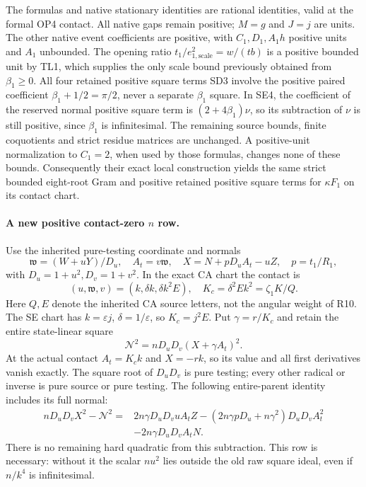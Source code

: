 The formulas and native stationary identities are rational identities,
valid at the formal OP4 contact. All native gaps remain positive; $M=g$
and $J=j$ are units. The other native event coefficients are positive,
with $C_1,D_1,A_1h$ positive units and $A_1$ unbounded. The opening
ratio $t_1/e_{1,\mathrm{scale}}^2=w/(tb)$ is a positive bounded unit
by TL1, which supplies the only scale bound previously obtained from
$\beta_1\ge0$. All four retained positive square terms SD3 involve the positive
paired coefficient $\beta_1+1/2=\pi/2$, never a separate
$\beta_1$ square. In SE4, the coefficient of the reserved normal positive square term
is $(2+4\beta_1)\nu$, so its subtraction of $\nu$ is still positive,
since $\beta_1$ is infinitesimal. The remaining source bounds, finite
coquotients and strict residue matrices are unchanged. A positive-unit
normalization to $C_1=2$, when used by those formulas, changes none of
these bounds. Consequently their exact local construction yields the
same strict bounded eight-root Gram and positive retained positive square terms for
$\kappa F_1$ on its contact chart.

\paragraph{A new positive contact-zero $n$ row.}
Use the inherited pure-testing coordinate and normals
\[
 \mathfrak w=(W+uY)/D_u,\quad A_t=v\mathfrak w,\quad
 X=N+pD_uA_t-uZ,\quad p=t_1/R_1,
\]
with $D_u=1+u^2,D_v=1+v^2$. In the exact CA chart the contact is
\[
 (u,\mathfrak w,v)=(k,\delta k,\delta k^2E),\quad
 K_c=\delta^2Ek^2=\zeta_1K/Q.
\]
Here $Q,E$ denote the inherited CA source letters, not the angular
weight of R10. The SE chart has $k=\varepsilon j$,
$\delta=1/\varepsilon$, so $K_c=j^2E$.
Put $\gamma=r/K_c$ and retain the entire state-linear square
\[
 \boxed{\quad \mathcal N^2=nD_uD_v(X+\gamma A_t)^2.\quad}
\tag{TL4}
\]
At the actual contact $A_t=K_ck$ and $X=-rk$, so its value and
all first derivatives vanish exactly. The square root of $D_uD_v$ is
pure testing; every other radical or inverse is pure source or pure
testing. The following entire-parent identity includes its full normal:
\[
\begin{split}
 nD_uD_vX^2-\mathcal N^2
 ={}&2n\gamma D_uD_vuA_tZ
 -(2n\gamma pD_u+n\gamma^2)D_uD_vA_t^2\\
 &-2n\gamma D_uD_vA_tN.
\end{split}
\tag{TL5}
\]
There is no remaining hard quadratic from this subtraction. This row
is necessary: without it the scalar $nu^2$ lies outside the old raw
square ideal, even if $n/k^4$ is infinitesimal.

